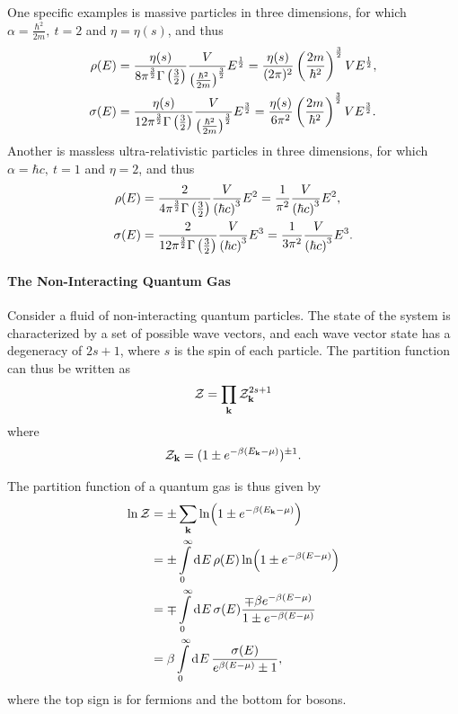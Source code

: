 One specific examples is massive particles in three dimensions, for which $\alpha = \frac{\hbar^{2}}{2m},\ t = 2$ and $\eta = \eta(s)$, and thus
\begin{align*}
	\rho(E)   &= \frac{\eta(s)}{8\pi^{\frac{3}{2}}\Gamma\left(\frac{3}{2}\right)}\frac{V}{\left(\frac{\hbar^{2}}{2m}\right)^{\frac{3}{2}}}E^{\frac{1}{2}} = \frac{\eta(s)}{(2\pi)^{2}}\left(\frac{2m}{\hbar^{2}}\right)^{\frac{3}{2}}VE^{\frac{1}{2}}, \\
	\sigma(E) &= \frac{\eta(s)}{12\pi^{\frac{3}{2}}\Gamma\left(\frac{3}{2}\right)}\frac{V}{\left(\frac{\hbar^{2}}{2m}\right)^{\frac{3}{2}}}E^{\frac{3}{2}} = \frac{\eta(s)}{6\pi^{2}}\left(\frac{2m}{\hbar^{2}}\right)^{\frac{3}{2}}VE^{\frac{3}{2}}.
\end{align*}
Another is massless ultra-relativistic particles in three dimensions, for which $\alpha = \hbar c,\ t = 1$ and $\eta = 2$, and thus
\begin{align*}
	\rho(E)   &= \frac{2}{4\pi^{\frac{3}{2}}\Gamma\left(\frac{3}{2}\right)}\frac{V}{\left(\hbar c\right)^{3}}E^{2} = \frac{1}{\pi^{2}}\frac{V}{\left(\hbar c\right)^{3}}E^{2}, \\
	\sigma(E) &= \frac{2}{12\pi^{\frac{3}{2}}\Gamma\left(\frac{3}{2}\right)}\frac{V}{\left(\hbar c\right)^{3}}E^{3} = \frac{1}{3\pi^{2}}\frac{V}{\left(\hbar c\right)^{3}}E^{3}.
\end{align*}

\paragraph{The Non-Interacting Quantum Gas}
Consider a fluid of non-interacting quantum particles. The state of the system is characterized by a set of possible wave vectors, and each wave vector state has a degeneracy of $2s + 1$, where $s$ is the spin of each particle. The partition function can thus be written as
\begin{align*}
	\mathcal{Z} = \prod\limits_{\vb{k}}\mathcal{Z}_{\vb{k}}^{2s + 1}
\end{align*}
where
\begin{align*}
	\mathcal{Z}_{\vb{k}} = (1 \pm e^{-\beta(E_{\vb{k}} - \mu)})^{\pm 1}.
\end{align*}

The partition function of a quantum gas is thus given by
\begin{align*}
	\ln{\mathcal{Z}} &= \pm\sum\limits_{\vb{k}}\ln(1 \pm e^{-\beta(E_{\vb{k}} - \mu)}) \\
	        &= \pm\int\limits_{0}^{\infty}\dd[]{E}\rho(E)\ln(1 \pm e^{-\beta(E - \mu)}) \\
	        &= \mp\int\limits_{0}^{\infty}\dd[]{E}\sigma(E)\frac{\mp\beta e^{-\beta(E - \mu)}}{1 \pm e^{-\beta(E - \mu)}} \\
	        &= \beta\int\limits_{0}^{\infty}\dd[]{E}\frac{\sigma(E)}{e^{\beta(E - \mu)} \pm 1},
\end{align*}
where the top sign is for fermions and the bottom for bosons.

